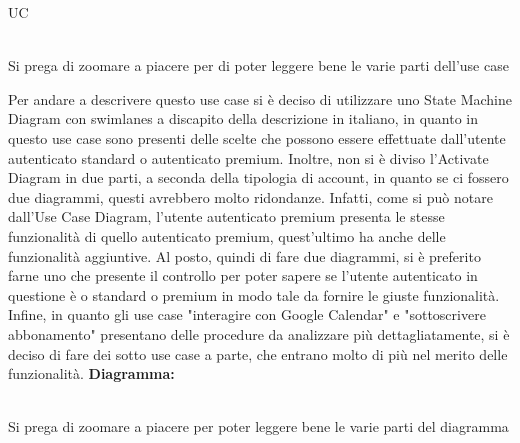 \begin{listaPersonale}{UC}
\begin{listaPersonale2}[UC] {}
    \end{listaPersonale2}





    \newpage

    \begin{center}
        \\
        Si prega di zoomare a piacere per di poter leggere bene le varie parti dell'use case
    \end{center}
    Per andare a descrivere questo use case si è deciso di utilizzare uno State Machine Diagram con swimlanes a discapito della descrizione in italiano, in quanto in questo use case sono presenti delle scelte che possono essere effettuate dall'utente autenticato standard o autenticato premium. Inoltre, non si è diviso l'Activate Diagram in due parti, a seconda della tipologia di account, in quanto se ci fossero due diagrammi, questi avrebbero molto ridondanze. Infatti, come si può notare dall'Use Case Diagram, l'utente autenticato premium presenta le stesse funzionalità di quello autenticato premium, quest'ultimo ha anche delle funzionalità aggiuntive. Al posto, quindi di fare due diagrammi, si è preferito farne uno che presente il controllo per poter sapere se l'utente autenticato in questione è o standard o premium in modo tale da fornire le giuste funzionalità.
    Infine, in quanto gli use case "interagire con Google Calendar" e "sottoscrivere abbonamento" presentano delle procedure da analizzare più dettagliatamente, si è deciso di fare dei sotto use case a parte, che entrano molto di più nel merito delle funzionalità.
    \newpage
    \textbf{Diagramma:}
    \begin{center}
        \\
        Si prega di zoomare a piacere per poter leggere bene le varie parti del diagramma
    \end{center}



\end{listaPersonale}

